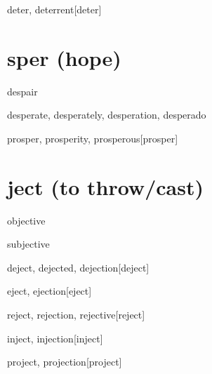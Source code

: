 \begin{RefWord}{deter, deterrent}[deter]
\end{RefWord}








\section{sper (hope)}

\begin{RefWord}{despair}
\end{RefWord}

\begin{RefWord}{desperate, desperately, desperation, desperado}
\end{RefWord}


\begin{RefWord}{prosper, prosperity, prosperous}[prosper]
\end{RefWord}

\section{ject (to throw/cast)}

\begin{RefWord}{objective}
\end{RefWord}

\begin{RefWord}{subjective}
\end{RefWord}

\begin{RefWord}{deject, dejected, dejection}[deject]
\end{RefWord}

\begin{RefWord}{eject, ejection}[eject]
\end{RefWord}

\begin{RefWord}{reject, rejection, rejective}[reject]
\end{RefWord}

\begin{RefWord}{inject, injection}[inject]
\end{RefWord}


\begin{RefWord}{project, projection}[project]
\end{RefWord}










